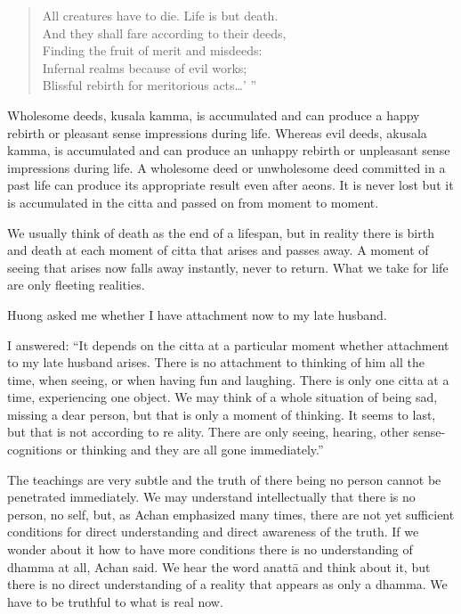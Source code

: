 \begin{verse}
All creatures have to die. Life is but death. \\
And they shall fare according to their deeds, \\
Finding the fruit of merit and misdeeds: \\
Infernal realms because of evil works;\\ 
Blissful rebirth for meritorious acts\ldots' '' 
\end{verse}

Wholesome deeds, kusala kamma, is accumulated and can produce a happy rebirth or 
pleasant sense impressions during life. Whereas evil deeds, akusala kamma, is accumulated and can produce an unhappy rebirth or unpleasant sense impressions during 
life. A wholesome deed or unwholesome deed committed in a past life can produce 
its appropriate result even after aeons. It is never lost but it is accumulated in the citta 
and passed on from moment to moment. 

We usually think of death as the end of a lifespan, but in reality there is birth and 
death at each moment of citta that arises and passes away. A moment of seeing that 
arises now falls away instantly, never to return. What we take for life are only fleeting realities. 

Huong asked me whether I have attachment now to my late husband. 

I answered: ``It depends on the citta at a particular moment whether attachment to my 
late husband arises. There is no attachment to thinking of him all the time, when seeing, or when having fun and laughing. There is only one citta at a time, experiencing 
one object. We may think of a whole situation of being sad, missing a dear person, 
but that is only a moment of thinking. It seems to last, but that is not according to re ality. There are only seeing, hearing, other sense-cognitions or thinking and they are 
all gone immediately.'' 

The teachings are very subtle and the truth of there being no person cannot be penetrated immediately. We may understand intellectually that there is no person, no self, 
but, as  Achan emphasized many times, there are not yet sufficient conditions for direct understanding and direct awareness of the truth. If we wonder about it how to 
have more conditions there is no understanding of dhamma at all,  Achan said. We 
hear the word anattā and think about it, but there is no direct understanding of a reality that appears as only a dhamma. We have to be truthful to what is real now. 

